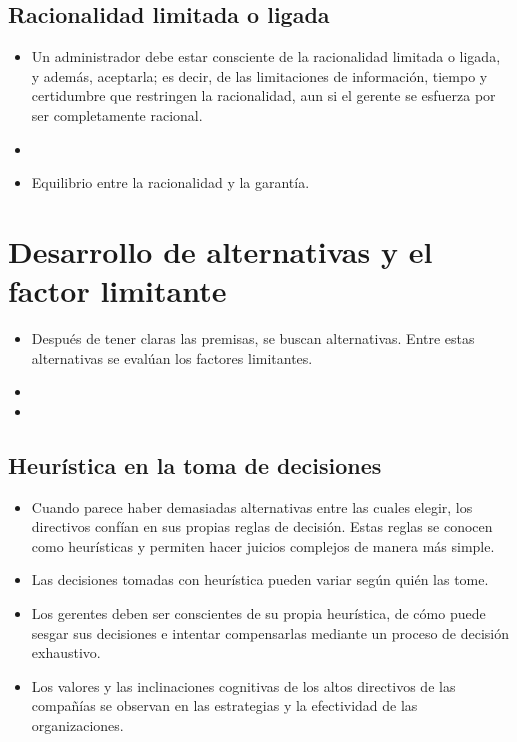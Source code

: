 \documentclass{article}
\begin{document}
\subsection{Racionalidad limitada o ligada}
\begin{itemize}
    \item Un administrador debe estar consciente de la racionalidad limitada o ligada, y además, aceptarla; es decir, de las limitaciones de información, tiempo y certidumbre que restringen la racionalidad, aun si el gerente se esfuerza por ser completamente racional. 
    \item {} 
    \item Equilibrio entre la racionalidad y la garantía. 
\end{itemize}



\section{Desarrollo de alternativas y el factor limitante}
\begin{itemize}
    \item Después de tener claras las premisas, se buscan alternativas. Entre estas alternativas se evalúan los factores limitantes. 
    \item {} 
    \item {} 
\end{itemize} 


\subsection{Heurística en la toma de decisiones}
\begin{itemize}
    \item Cuando parece haber demasiadas alternativas entre las cuales elegir, los directivos confían en sus propias reglas de decisión. Estas reglas se conocen como heurísticas y permiten hacer juicios complejos de manera más simple. 
    \item Las decisiones tomadas con heurística pueden variar según quién las tome. 
    \item Los gerentes deben ser conscientes de su propia heurística, de cómo puede sesgar sus decisiones e intentar compensarlas mediante un proceso de decisión exhaustivo.
    \item Los valores y las inclinaciones cognitivas de los altos directivos de las compañías se observan en las estrategias y la efectividad de las organizaciones. 
\end{itemize} 
\end{document}
